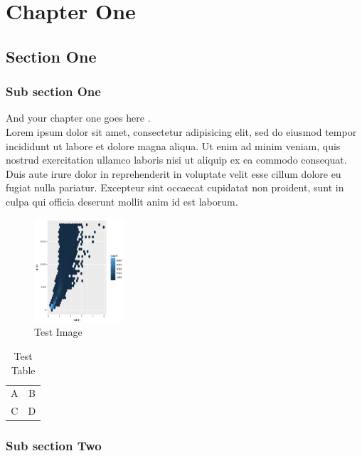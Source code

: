 \documentclass[a4paper, oneside]{report}
\begin{document}
\chapter{Chapter One}%
\label{chap:chapterone}

\section{Section One}
\label{chap:sectionone}

\subsection{Sub section One}

And your chapter one goes here \cite{web001,Nom2012}. \\
  Lorem ipsum dolor sit amet, consectetur adipisicing elit, sed do eiusmod
  tempor incididunt ut labore et dolore magna aliqua. Ut enim ad minim veniam, quis nostrud exercitation ullamco laboris nisi ut aliquip ex ea commodo consequat. Duis aute irure dolor in reprehenderit in voluptate velit esse
  cillum dolore eu fugiat nulla pariatur. Excepteur sint occaecat cupidatat non
  proident, sunt in culpa qui officia deserunt mollit anim id est laborum.

  \begin{figure}[h]%
    \center%
    \includegraphics[width=0.3\textwidth]{diamonds.pdf}%
    \caption[This is a test image]{Test Image}\label{fig:test}%
  \end{figure}


\begin{table}
\begin{tabular}{cc}
A & B \\
C & D
\end{tabular}
\caption{Test Table}
\end{table}

 \subsection{Sub section Two}
\end{document}
